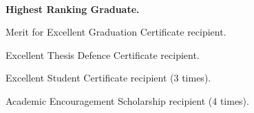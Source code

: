 \\
\begin{zitemize}
    \item \textbf{Highest Ranking Graduate.}
    \item Merit for Excellent Graduation Certificate recipient.
    \item Excellent Thesis Defence Certificate recipient.
    \item Excellent Student Certificate recipient (3 times).
    \item Academic Encouragement Scholarship recipient (4 times).
\end{zitemize}


